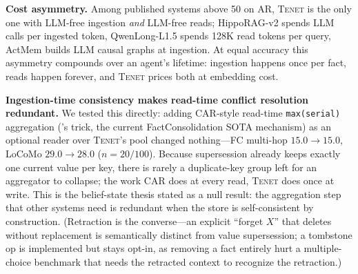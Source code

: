 \documentclass[11pt]{article}
\newcommand{\tenet}{\textsc{Tenet}}
\begin{document}
\textbf{Cost asymmetry.} Among published systems above 50 on AR, \tenet{} is the only one
with LLM-free ingestion \emph{and} LLM-free reads; HippoRAG-v2 spends LLM calls per
ingested token, QwenLong-L1.5 spends 128K read tokens per query, ActMem builds LLM causal
graphs at ingestion. At equal accuracy this asymmetry compounds over an agent's lifetime:
ingestion happens once per fact, reads happen forever, and \tenet{} prices both at
embedding cost.

\textbf{Ingestion-time consistency makes read-time conflict resolution redundant.} We
tested this directly: adding CAR-style read-time \texttt{max(serial)} aggregation
(\cite{freshness}'s trick, the current FactConsolidation SOTA mechanism) as an optional
reader over \tenet{}'s pool changed nothing---FC multi-hop $15.0\to15.0$, LoCoMo
$29.0\to28.0$ ($n{=}20/100$). Because supersession already keeps exactly one current value
per key, there is rarely a duplicate-key group left for an aggregator to collapse; the work
CAR does at every read, \tenet{} does once at write. This is the belief-state thesis stated
as a null result: the aggregation step that other systems need is redundant when the store
is self-consistent by construction. (Retraction is the converse---an explicit ``forget
$X$'' that deletes without replacement is semantically distinct from value supersession; a
tombstone op is implemented but stays opt-in, as removing a fact entirely hurt a
multiple-choice benchmark that needs the retracted context to recognize the retraction.)
\end{document}
